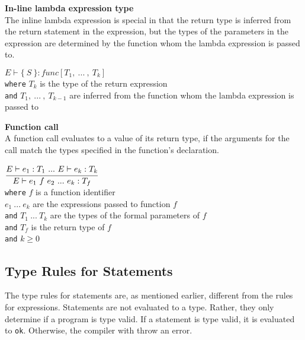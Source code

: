 \textbf{In-line lambda expression type}\\
The inline lambda expression is special in that the return type is inferred from the return statement in the expression, but the types of the parameters in the expression are determined by the function whom the lambda expression is passed to.

\begin{center}
	\begin{math}
	E \vdash \{\ S\ \} : func[T_1,\ .
	.
	.
	\ ,\ T_k]
	\end{math}
	\\[1\baselineskip]
	\texttt{where} $T_k$ is the type of the return expression\\
	\texttt{and} $T_1, \ .
	.
	.
	\ ,\ T_{k-1}$ are inferred from the function whom the lambda expression is passed to%
\end{center}

\textbf{Function call}\\
A function call evaluates to a value of its return type, if the arguments for the call match the types specified in the function's declaration.

\begin{center}
	\begin{math}
		\cfrac
		{E \vdash e_1 : T_1 \ .
		.
		.
		\ E \vdash e_k : T_k}
		{E \vdash e_1\ f\ e_2 \ .
		.
		.
		\ e_k : T_f}
	\end{math}
	\\[1\baselineskip]
	\texttt{where} $f$ is a function identifier\\
	$e_1\ .
	.
	.
	\ e_k$ are the expressions passed to function $f$\\
	\texttt{and} $T_1\ .
	.
	.
	\ T_k$ are the types of the formal parameters of $f$\\
	\texttt{and} $T_f$ is the return type of $f$\\
	\texttt{and} $k \ge 0$
\end{center}



\subsection{Type Rules for Statements}
The type rules for statements are, as mentioned earlier, different from the rules for expressions.
Statements are not evaluated to a type.
Rather, they only determine if a program is type valid.
If a statement is type valid, it is evaluated to \texttt{ok}.
Otherwise, the compiler with throw an error.

